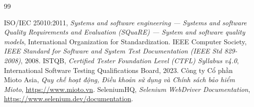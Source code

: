 \documentclass[12pt,a4paper,oneside]{report}
\begin{document}
\begin{thebibliography}{99}
   ISO/IEC 25010:2011, \textit{Systems and software engineering --- Systems and software Quality Requirements and Evaluation (SQuaRE) --- System and software quality models}, International Organization for Standardization.
   IEEE Computer Society, \textit{IEEE Standard for Software and System Test Documentation (IEEE Std 829-2008)}, 2008.
   ISTQB, \textit{Certified Tester Foundation Level (CTFL) Syllabus v4.0}, International Software Testing Qualifications Board, 2023.
   Công ty Cổ phần Mioto Asia, \textit{Quy chế hoạt động, Điều khoản sử dụng và Chính sách bảo hiểm Mioto}, \url{https://www.mioto.vn}.
   SeleniumHQ, \textit{Selenium WebDriver Documentation}, \url{https://www.selenium.dev/documentation}.
\end{thebibliography}
\end{document}
